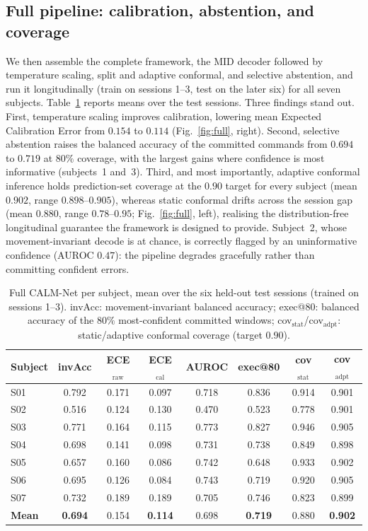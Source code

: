 \documentclass[journal]{IEEEtran}
\begin{document}
\subsection{Full pipeline: calibration, abstention, and coverage}
We then assemble the complete framework, the MID decoder followed by temperature
scaling, split and adaptive conformal, and selective abstention, and run it
longitudinally (train on sessions 1--3, test on the later six) for all seven
subjects. Table~\ref{tab:full} reports means over the test sessions. Three findings
stand out. First, temperature scaling improves calibration, lowering mean Expected
Calibration Error from $0.154$ to $0.114$ (Fig.~\ref{fig:full}, right). Second,
selective abstention raises the balanced accuracy of the committed commands from
$0.694$ to $0.719$ at $80\%$ coverage, with the largest gains where confidence is
most informative (subjects~1 and~3). Third, and most importantly, adaptive conformal
inference holds prediction-set coverage at the $0.90$ target for every subject (mean
$0.902$, range $0.898$--$0.905$), whereas static conformal drifts across the session
gap (mean $0.880$, range $0.78$--$0.95$; Fig.~\ref{fig:full}, left), realising the
distribution-free longitudinal guarantee the framework is designed to provide.
Subject~2, whose movement-invariant decode is at chance, is correctly flagged by an
uninformative confidence (AUROC $0.47$): the pipeline degrades gracefully rather
than committing confident errors.

\begin{table}[t]
\caption{Full CALM-Net per subject, mean over the six held-out test sessions
(trained on sessions 1--3). invAcc: movement-invariant balanced accuracy;
exec@80: balanced accuracy of the $80\%$ most-confident committed windows;
cov$_{\text{stat}}$/cov$_{\text{adpt}}$: static/adaptive conformal coverage
(target $0.90$).}
\label{tab:full}
\centering
\begin{tabular}{lccccccc}
\toprule
Subject & invAcc & ECE$_{\text{raw}}$ & ECE$_{\text{cal}}$ & AUROC & exec@80 & cov$_{\text{stat}}$ & cov$_{\text{adpt}}$ \\
\midrule
S01 & 0.792 & 0.171 & 0.097 & 0.718 & 0.836 & 0.914 & 0.901 \\
S02 & 0.516 & 0.124 & 0.130 & 0.470 & 0.523 & 0.778 & 0.901 \\
S03 & 0.771 & 0.164 & 0.115 & 0.773 & 0.827 & 0.946 & 0.905 \\
S04 & 0.698 & 0.141 & 0.098 & 0.731 & 0.738 & 0.849 & 0.898 \\
S05 & 0.657 & 0.160 & 0.086 & 0.742 & 0.648 & 0.933 & 0.902 \\
S06 & 0.695 & 0.126 & 0.084 & 0.743 & 0.719 & 0.920 & 0.905 \\
S07 & 0.732 & 0.189 & 0.189 & 0.705 & 0.746 & 0.823 & 0.899 \\
\midrule
\textbf{Mean} & \textbf{0.694} & 0.154 & \textbf{0.114} & 0.698 & \textbf{0.719} & 0.880 & \textbf{0.902} \\
\bottomrule
\end{tabular}
\end{table}
\end{document}
